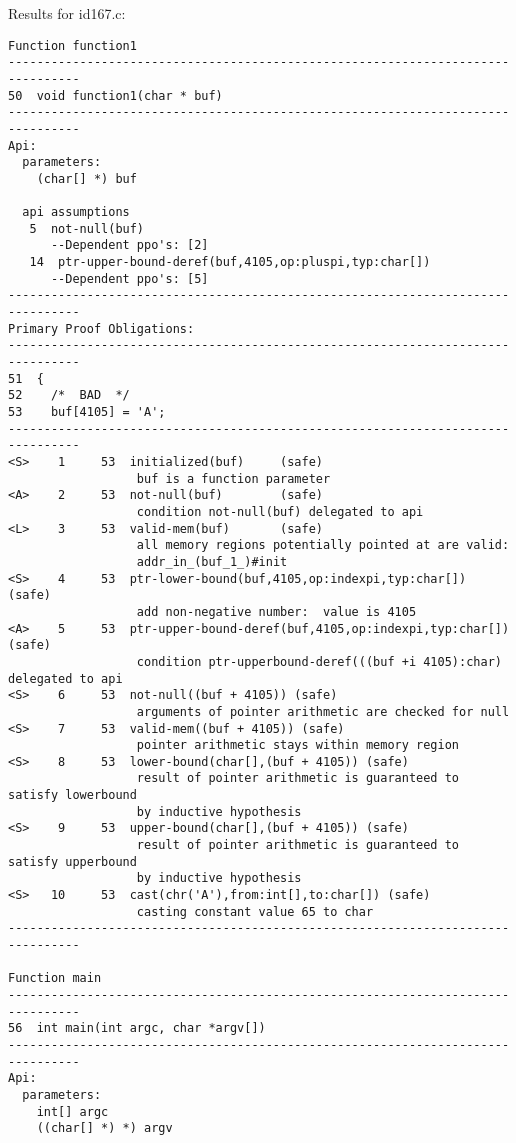 \documentclass[11pt]{article}
\begin{document}
Results for id167.c:
\begin{scriptsize}
\begin{verbatim}
Function function1
--------------------------------------------------------------------------------
50  void function1(char * buf)
--------------------------------------------------------------------------------
Api:
  parameters:
    (char[] *) buf

  api assumptions
   5  not-null(buf)
      --Dependent ppo's: [2]
   14  ptr-upper-bound-deref(buf,4105,op:pluspi,typ:char[])
      --Dependent ppo's: [5]
--------------------------------------------------------------------------------
Primary Proof Obligations:
--------------------------------------------------------------------------------
51  {
52    /*  BAD  */
53    buf[4105] = 'A';
--------------------------------------------------------------------------------
<S>    1     53  initialized(buf)     (safe)
                  buf is a function parameter
<A>    2     53  not-null(buf)        (safe)
                  condition not-null(buf) delegated to api
<L>    3     53  valid-mem(buf)       (safe)
                  all memory regions potentially pointed at are valid: 
                  addr_in_(buf_1_)#init
<S>    4     53  ptr-lower-bound(buf,4105,op:indexpi,typ:char[]) (safe)
                  add non-negative number:  value is 4105
<A>    5     53  ptr-upper-bound-deref(buf,4105,op:indexpi,typ:char[]) (safe)
                  condition ptr-upperbound-deref(((buf +i 4105):char) delegated to api
<S>    6     53  not-null((buf + 4105)) (safe)
                  arguments of pointer arithmetic are checked for null
<S>    7     53  valid-mem((buf + 4105)) (safe)
                  pointer arithmetic stays within memory region
<S>    8     53  lower-bound(char[],(buf + 4105)) (safe)
                  result of pointer arithmetic is guaranteed to satisfy lowerbound 
                  by inductive hypothesis
<S>    9     53  upper-bound(char[],(buf + 4105)) (safe)
                  result of pointer arithmetic is guaranteed to satisfy upperbound 
                  by inductive hypothesis
<S>   10     53  cast(chr('A'),from:int[],to:char[]) (safe)
                  casting constant value 65 to char
--------------------------------------------------------------------------------

Function main
--------------------------------------------------------------------------------
56  int main(int argc, char *argv[])
--------------------------------------------------------------------------------
Api:
  parameters:
    int[] argc
    ((char[] *) *) argv


\end{verbatim}
\end{scriptsize}
\end{document}
